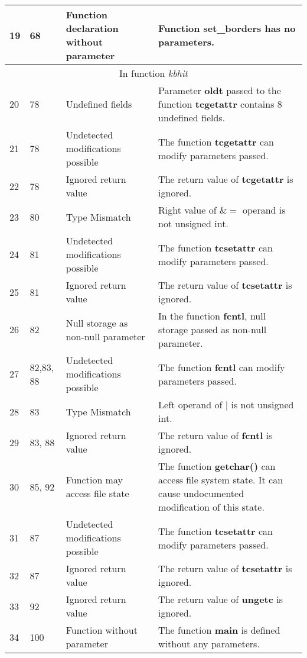 \documentclass[]{article}
\begin{document}
\begin{longtable}{ |p{0.5cm}|p{0.75cm}|p{3cm}|p{9cm}|  }
 		\hline 
 		19 & 68 & Function declaration without parameter & Function \textbf{set\_borders} has no parameters. \\
 		\hline 
 		\multicolumn{4}{|c|}{In function \textit{kbhit}} \\
 		\hline 
 		20 & 78 & Undefined fields & Parameter \textbf{oldt} passed to the function \textbf{tcgetattr} contains 8 undefined fields. \\
 		\hline 
 		21 & 78 & Undetected modifications possible & The function \textbf{tcgetattr} can modify parameters passed. \\
 		\hline 
 		22 & 78 & Ignored return value & The return value of \textbf{tcgetattr} is ignored. \\
 		\hline 
 		23 & 80 & Type Mismatch & Right value of $\&=$ operand is not unsigned int. \\
 		\hline 
 		24 & 81 & Undetected modifications possible & The function \textbf{tcsetattr} can modify parameters passed. \\
 		\hline 
 		25 & 81 & Ignored return value & The return value of \textbf{tcsetattr} is ignored. \\
 		\hline 
 		26 & 82 & Null storage as non-null parameter & In the function \textbf{fcntl}, null storage passed as non-null parameter. \\
 		\hline 
 		27 & 82,83, 88 & Undetected modifications possible & The function \textbf{fcntl} can modify parameters passed. \\
 		\hline 
 		28 & 83 & Type Mismatch & Left operand of $|$ is not unsigned int. \\
 		\hline 
 		29 & 83, 88 & Ignored return value & The return value of \textbf{fcntl} is ignored. \\
 		\hline 
 		30 & 85, 92 & Function may access file state & The function \textbf{getchar()} can access file system state. It can cause undocumented modification of this state. \\
 		\hline 
 		31 & 87 & Undetected modifications possible & The function \textbf{tcsetattr} can modify parameters passed. \\
 		\hline 
 		32 & 87 & Ignored return value & The return value of \textbf{tcsetattr} is ignored. \\
 		\hline 
 		33 & 92 & Ignored return value & The return value of \textbf{ungetc} is ignored. \\
 		\hline 
 		34 & 100 & Function without parameter & The function \textbf{main} is defined without any parameters. \\

\end{longtable}
\end{document}
